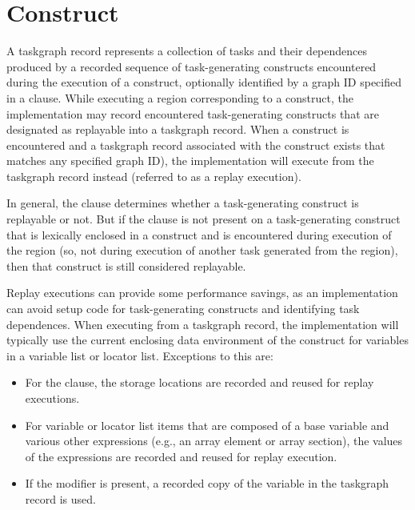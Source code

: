 \section{ Construct}

\label{sec:taskgraph}

A taskgraph record represents a collection of tasks and their dependences
produced by a recorded sequence of task-generating constructs encountered
during the execution of a  construct, optionally identified by
a graph ID specified in a  clause. While executing a region
corresponding to a  construct, the implementation may record
encountered task-generating constructs that are designated as replayable into a
taskgraph record. When a  construct is encountered and a
taskgraph record associated with the construct exists that matches any
specified graph ID), the implementation will execute from the taskgraph record
instead (referred to as a replay execution). 

In general, the  clause determines whether a task-generating
construct is replayable or not. But if the  clause is not
present on a task-generating construct that is lexically enclosed in a
 construct and is encountered during execution of the
 region (so, not during execution of another task generated
from the  region), then that construct is still considered
replayable.

Replay executions can provide some performance savings, as an implementation
can avoid setup code for task-generating constructs and identifying task
dependences. When executing from a taskgraph record, the implementation will
typically use the current enclosing data environment of the 
construct for variables in a variable list or locator list. Exceptions to this
are:

\begin{itemize}
\item For the  clause, the storage locations are recorded and
      reused for replay executions.

\item For variable or locator list items that are composed of a base variable and
      various other expressions (e.g., an array element or array section), the
        values of the expressions are recorded and reused for replay execution.

\item If the  modifier is present, a recorded copy of the variable
      in the taskgraph record is used.
\end{itemize}

